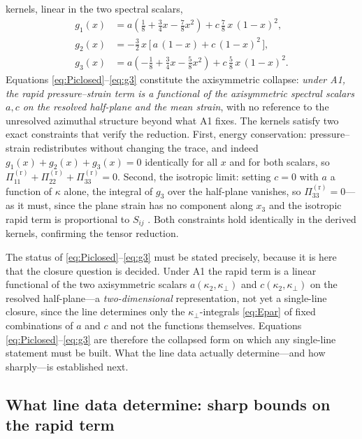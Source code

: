 \documentclass[lineno]{JFM-FLM_Au}
\begin{document}
kernels, linear in the two spectral scalars,
\begin{align}
  g_{1}(x) &= a\!\left(\tfrac18 + \tfrac34 x - \tfrac78 x^2\right)
            + c\,\tfrac78\,x\,(1-x)^2, \label{eq:g1}\\[2pt]
  g_{2}(x) &= -\tfrac32\,x\,\bigl[\,a\,(1-x) + c\,(1-x)^2\,\bigr],
            \label{eq:g2}\\[2pt]
  g_{3}(x) &= a\!\left(-\tfrac18 + \tfrac34 x - \tfrac58 x^2\right)
            + c\,\tfrac58\,x\,(1-x)^2. \label{eq:g3}
\end{align}
Equations \eqref{eq:Piclosed}--\eqref{eq:g3} constitute the axisymmetric collapse:
\emph{under A1, the rapid pressure--strain term is a
functional of the axisymmetric spectral scalars $a,c$ on the resolved
half-plane and the mean strain}, with no reference to the unresolved azimuthal
structure beyond what A1 fixes. The kernels satisfy two exact constraints that
verify the reduction. First, energy conservation: pressure--strain
redistributes without changing the trace, and indeed
$g_1(x)+g_2(x)+g_3(x)=0$ identically for all $x$ and for both scalars, so
$\Pi^{(\mathrm r)}_{11}+\Pi^{(\mathrm r)}_{22}+\Pi^{(\mathrm r)}_{33}=0$.
Second, the isotropic limit: setting $c=0$ with $a$ a function of $\kappa$
alone, the integral of $g_3$ over the half-plane vanishes, so
$\Pi^{(\mathrm r)}_{33}=0$---as it must, since the plane strain has no
component along $x_3$ and the isotropic rapid term is proportional to $S_{ij}$
\citep{Crow1968}. Both constraints hold identically in the derived kernels,
confirming the tensor reduction.

The status of \eqref{eq:Piclosed}--\eqref{eq:g3} must be stated precisely,
because it is here that the closure question is decided. Under A1 the rapid
term is a linear functional of the two axisymmetric scalars
$a(\kappa_2,\kappa_\perp)$ and $c(\kappa_2,\kappa_\perp)$ on the resolved
half-plane---a \emph{two-dimensional} representation, not yet a single-line
closure, since the line determines only the $\kappa_\perp$-integrals
\eqref{eq:Epar} of fixed combinations of $a$ and $c$ and not the functions
themselves. 
Equations \eqref{eq:Piclosed}--\eqref{eq:g3} are therefore the collapsed form on which any single-line statement must be built. What the line data actually determine—and how sharply—is established next.

\subsection{What line data determine: sharp bounds on the rapid term}
\label{sec:bounds}
\end{document}
